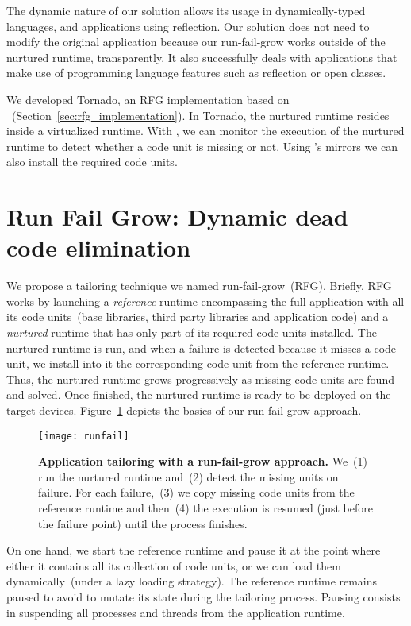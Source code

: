 The dynamic nature of our solution allows its usage in dynamically-typed languages, and applications using reflection. Our solution does not need to modify the original application because our run-fail-grow works outside of the nurtured runtime, transparently.
It also successfully deals with applications that make use of programming language features such as reflection or open classes.

We developed Tornado, an RFG implementation based on \Vtt~(Section~\ref{sec:rfg_implementation}). In Tornado, the nurtured runtime resides inside a virtualized runtime. With \Vtt, we can monitor the execution of the nurtured runtime to detect whether a code unit is missing or not. Using \Vtt's mirrors we can also install the required code units.

\section{Run Fail Grow: Dynamic dead code elimination}\label{sec:rfg_model}

We propose a tailoring technique we named run-fail-grow~(RFG). Briefly, RFG works by launching a \emph{reference} runtime encompassing the full application with all its code units~(base libraries, third party libraries and application code) and a \emph{nurtured} runtime that has only part of its required code units installed. The nurtured runtime is run, and when a failure is detected because it misses a code unit, we install into it the corresponding code unit from the reference runtime. Thus, the nurtured runtime grows progressively as missing code units are found and solved.
Once finished, the nurtured runtime is ready to be deployed on the target devices. Figure~\ref{fig:runfail} depicts the basics of our run-fail-grow approach.

\begin{figure}[ht]
\begin{center}
\texttt{[image: runfail]}
\caption{\textbf{Application tailoring with a run-fail-grow approach.} We~(1) run the nurtured runtime and~(2) detect the missing units on failure. For each failure,~(3) we copy missing code units from the reference runtime and then~(4) the execution is resumed (just before the failure point) until the process finishes. \label{fig:runfail}}
\end{center}
\end{figure}

On one hand, we start the reference runtime and pause it at the point where either it contains all its collection of code units, or we can load them dynamically~(under a lazy loading strategy). The reference runtime remains paused to avoid to mutate its state during the tailoring process. Pausing consists in suspending all processes and threads from the application runtime.

